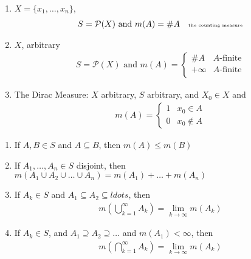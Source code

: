 \begin{example}
	\begin{enumerate}
		\item $X = \{x_1, \ldots, x_n\}$,
			\begin{align*}
				S = \mathcal{P}(X) \text{ and } m(A) = \#A \quad \text{\tiny the counting measure}
			\end{align*} 
		\item $X$, arbitrary
			\begin{align*}
				S = \mathcal{P}(X) \text{ and } m(A) = 
				\begin{cases}
					\#A & A\text{-finite} \\
					+\infty & A\text{-finite} \\
				\end{cases}
			\end{align*} 

		\item The Dirac Measure:
			$X$ arbitrary, $S$ arbitrary, and $X_0 \in X$ and 
			\begin{align*}
				m(A) = 
				\begin{cases}
					1 & x_0 \in A \\
					0 & x_0 \notin A
				\end{cases}
			\end{align*}
	\end{enumerate}
\end{example}


\begin{definition}
	\begin{enumerate}
		\item If $A,B \in S$  and $A \subseteq B$, then $m(A) \leq m(B)$
		\item If  $A_1, \ldots, A_n \in S$ disjoint, then 
			$m(A_1 \cup A_2 \cup \ldots \cup A_n) = m(A_1) + \ldots + m(A_n)$
		\item If  $A_k \in S$ and $A_1 \subseteq A_2 \subseteq ldots$, then
			\begin{align*}
				m(\bigcup_{k=1}^{\infty} A_k ) = \lim_{k \to \infty} m(A_k)
			\end{align*} 
		\item If $A_k \in S$, and $A_1 \supseteq A_2 \supseteq \ldots$ and $m(A_1) < \infty$,
			then  
			 \begin{align*}
				m(\bigcap_{k=1}^{\infty} A_k) = \lim_{k \to \infty}  m(A_k)
			\end{align*} 
	\end{enumerate}
\end{definition}

